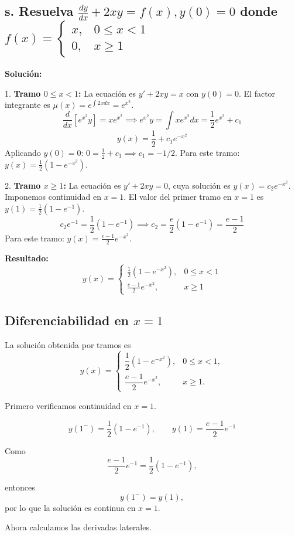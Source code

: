 \documentclass[a4paper]{article}
\begin{document}
\subsection*{s. Resuelva $\frac{dy}{dx} + 2xy = f(x), y(0) = 0$ donde $f(x) = \begin{cases} x, & 0 \le x < 1 \\ 0, & x \ge 1 \end{cases}$}

\textbf{Solución:}

1. \textbf{Tramo $0 \le x < 1$:}
La ecuación es $y' + 2xy = x$ con $y(0) = 0$. El factor integrante es $\mu(x) = e^{\int 2x dx} = e^{x^2}$.
$$\frac{d}{dx}[e^{x^2} y] = x e^{x^2} \implies e^{x^2} y = \int x e^{x^2} dx = \frac{1}{2} e^{x^2} + c_1$$
$$y(x) = \frac{1}{2} + c_1 e^{-x^2}$$
Aplicando $y(0) = 0$: $0 = \frac{1}{2} + c_1 \implies c_1 = -1/2$.
Para este tramo: $y(x) = \frac{1}{2}(1 - e^{-x^2})$.

2. \textbf{Tramo $x \ge 1$:}
La ecuación es $y' + 2xy = 0$, cuya solución es $y(x) = c_2 e^{-x^2}$.
Imponemos continuidad en $x=1$. El valor del primer tramo en $x=1$ es $y(1) = \frac{1}{2}(1 - e^{-1})$.
$$c_2 e^{-1} = \frac{1}{2}(1 - e^{-1}) \implies c_2 = \frac{e}{2}(1 - e^{-1}) = \frac{e - 1}{2}$$
Para este tramo: $y(x) = \frac{e - 1}{2} e^{-x^2}$.

\textbf{Resultado:}
$$y(x) = \begin{cases} \frac{1}{2}(1 - e^{-x^2}), & 0 \le x < 1 \\ \frac{e - 1}{2} e^{-x^2}, & x \ge 1 \end{cases}$$

\subsection*{Diferenciabilidad en $x=1$}

La solución obtenida por tramos es
$$
y(x)=
\begin{cases}
\dfrac12(1-e^{-x^2}), & 0\le x<1,\\
\dfrac{e-1}{2}e^{-x^2}, & x\ge 1.
\end{cases}
$$

Primero verificamos continuidad en $x=1$.

$$
y(1^-)=\frac12(1-e^{-1}), 
\qquad
y(1)=\frac{e-1}{2}e^{-1}
$$

Como
$$
\frac{e-1}{2}e^{-1}=\frac12(1-e^{-1}),
$$

entonces
$$
y(1^-)=y(1),
$$
por lo que la solución es continua en $x=1$.

Ahora calculamos las derivadas laterales.
\end{document}
